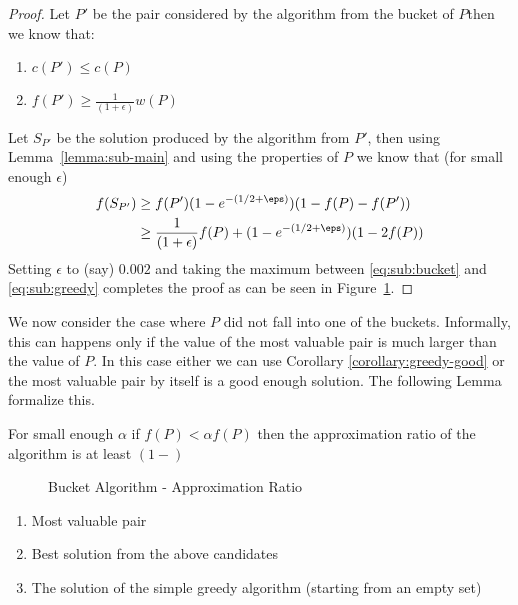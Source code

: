 \begin{proof}
	Let $P'$ be the pair considered by the algorithm from the bucket of $P$then we know that:
	\begin{enumerate}
		\item $c(P') \leq c(P)$
		\item $f(P') \geq \frac{1}{(1 + \epsilon)}w(P)$
	\end{enumerate}
	Let $S_{P'}$ be the solution produced by the algorithm from $P'$,
	then using Lemma~\ref{lemma:sub-main} and using the properties of $P$ we know that (for small enough $\epsilon$)
	\begin{align}
		\label{eq:sub:bucket}
		f(S_{P'}) & \geq f(P') (1-e^{-(1/2 + \eps)})(1 - f(P) - f(P'))
		\\ & \geq \frac{1}{(1 + \epsilon)}f(P) + (1-e^{-(1/2 + \eps)})(1 - 2f(P))
	\end{align}
	Setting $\epsilon$ to (say) $0.002$ and taking the maximum between \ref{eq:sub:bucket} and
	\ref{eq:sub:greedy} completes the proof as can be seen in Figure~\ref{fig:sub:bucket}.
\end{proof}

We now consider the case where $P$ did not fall into one of the buckets.
Informally, this can happens only if the value of the most valuable pair is much larger than the value of $P$. 
In this case either we can use Corollary \ref{corollary:greedy-good} or the most valuable pair by itself is a good enough solution.
The following Lemma formalize this.

\begin{lemma}
	For small enough $\alpha$ if $f(P) < \alpha f(P)$ then the approximation ratio of the algorithm is at least $(1 - )$
	
\end{lemma}

\begin{figure}
	\def\zeta{0.002}
	\caption{
		\label{fig:sub:bucket}
		Bucket Algorithm - Approximation Ratio
	}
\end{figure}


\begin{enumerate}
	\item Most valuable pair
	\item Best solution from the above candidates
	\item The solution of the simple greedy algorithm (starting from an empty set)
\end{enumerate}
